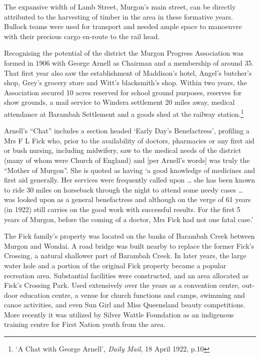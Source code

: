 The expansive width of Lamb Street, Murgon's main street, can be directly attributed to the harvesting of timber in the area in these formative years. Bullock teams were used for transport and needed ample space to manoeuvre with their precious cargo en-route to the rail head.

Recognising the potential of the district the Murgon Progress Association was formed in 1906 with George Arnell as Chairman and a membership of around 35. That first year also saw the establishment of Maddison's hotel, Angel's butcher's shop, Grey's grocery store and Witt's blacksmith's shop. Within two years, the Association secured 10 acres reserved for school ground purposes, reserves for show grounds, a mail service to Windera settlement 20 miles away, medical attendance at Barambah Settlement and a goods shed at the railway station.\footnote{`A Chat with George Arnell'\emph{, Daily Mail,} 18 April 1922, p.10}

Arnell's ``Chat'' includes a section headed `Early Day's Benefactress', profiling a Mrs F L Fick who, prior to the availability of doctors, pharmacies or any first aid or bush nursing, including midwifery, saw to the medical needs of the district (many of whom were Church of England) and {[}per Arnell's words{]} was truly the ``Mother of Murgon''. She is quoted as having `a good knowledge of medicines and first aid generally. Her services were frequently called upon \ldots{} she has been known to ride 30 miles on horseback through the night to attend some needy cases \ldots{} was looked upon as a general benefactress and although on the verge of 61 years (in 1922) still carries on the good work with successful results. For the first 5 years of Murgon, before the coming of a doctor, Mrs Fick had not one fatal case.'

The Fick family's property was located on the banks of Barambah Creek between Murgon and Wondai. A road bridge was built nearby to replace the former Fick's Crossing\emph{,} a natural shallower part of Barambah Creek. In later years, the large water hole and a portion of the original Fick property became a popular recreation area. Substantial facilities were constructed, and an area allocated as Fick's Crossing Park\emph{.} Used extensively over the years as a convention centre, out-door education centre, a venue for church functions and camps, swimming and canoe activities, and even Sun Girl and Miss Queensland beauty competitions. More recently it was utilized by Silver Wattle Foundation as an indigenous training centre for First Nation youth from the area.

